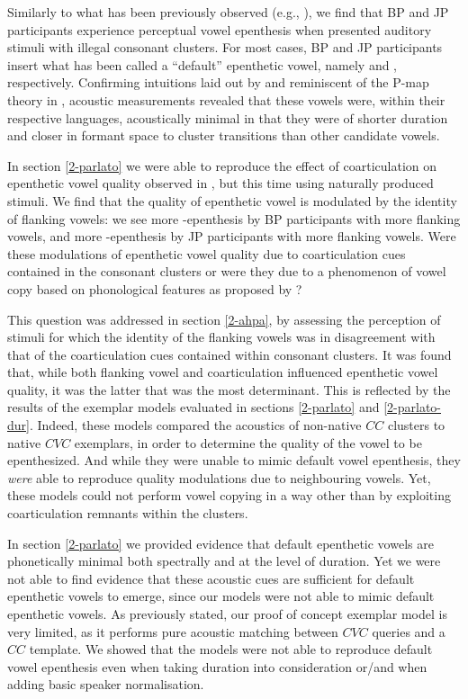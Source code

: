 Similarly to what has been previously observed (e.g., \cite{dupoux1999, dehaene2000, dupoux2011, monahan2009, mattingley2015}), we find that BP and JP participants experience perceptual vowel epenthesis when presented auditory stimuli with illegal consonant clusters. For most cases, BP and JP participants insert what has been called a ``default'' epenthetic vowel, namely  and , respectively. Confirming intuitions laid out by \cite{dupoux2011} and reminiscent of the P-map theory in \cite{steriade2001}, acoustic measurements revealed that these vowels were, within their respective languages, acoustically minimal in that they were of shorter duration and closer in formant space to cluster transitions than other candidate vowels. 

In section \ref{2-parlato} we were able to reproduce the effect of coarticulation on epenthetic vowel quality observed in \cite{dupoux2011}, but this time using naturally produced stimuli. We find that the quality of epenthetic vowel is modulated by the identity of flanking vowels: we see more -epenthesis by BP participants with more  flanking vowels, and more -epenthesis by JP participants with more  flanking vowels. Were these modulations of epenthetic vowel quality due to coarticulation cues contained in the consonant clusters or were they due to a phenomenon of vowel copy based on phonological features as proposed by \cite{rose2006, uffmann2006}? 

This question was addressed in section \ref{2-ahpa}, by assessing the perception of stimuli for which the identity of the flanking vowels was in disagreement with that of the coarticulation cues contained within consonant clusters. It was found that, while both flanking vowel and coarticulation influenced epenthetic vowel quality, it was the latter that was the most determinant. This is reflected by the results of the exemplar models evaluated in sections \ref{2-parlato} and \ref{2-parlato-dur}. Indeed, these models compared the acoustics of non-native $CC$ clusters to native $CVC$ exemplars, in order to determine the quality of the vowel to be epenthesized. And while they were unable to mimic default vowel epenthesis, they \textit{were} able to reproduce quality modulations due to neighbouring vowels. Yet, these models could not perform vowel copying in a way other than by exploiting coarticulation remnants within the clusters.              

In section \ref{2-parlato} we provided evidence that default epenthetic vowels are phonetically minimal both spectrally and at the level of duration. Yet we were not able to find evidence that these acoustic cues are sufficient for default epenthetic vowels to emerge, since our models were not able to mimic default epenthetic vowels.  
As previously stated, our proof of concept exemplar model is very limited, as it performs pure acoustic matching between $CVC$ queries and a $CC$ template. We showed that the models were not able to reproduce default vowel epenthesis even when taking duration into consideration or/and when adding basic speaker normalisation.

